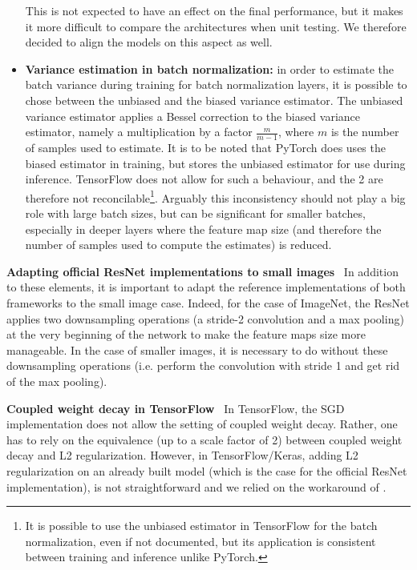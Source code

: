 \documentclass{article}
\newcommand{\myparagraph}[1]{\vspace{1mm}\noindent\textbf{#1} \,}
\begin{document}
\begin{itemize}[topsep=0pt,itemsep=1ex,partopsep=0ex,parsep=0ex,leftmargin=3ex]
    This is not expected to have an effect on the final performance, but it makes it more difficult to compare the architectures when unit testing.
    We therefore decided to align the models on this aspect as well.
    \item \textbf{Variance estimation in batch normalization:} in order to estimate the batch variance during training for batch normalization layers, it is possible to chose between the unbiased and the biased variance estimator.
    The unbiased variance estimator applies a Bessel correction to the biased variance estimator, namely a multiplication by a factor $\frac{m}{m-1}$, where $m$ is the number of samples used to estimate.
    It is to be noted that PyTorch does uses the biased estimator in training, but stores the unbiased estimator for use during inference.
    TensorFlow does not allow for such a behaviour, and the 2 are therefore not reconcilable\footnote{It is possible to use the unbiased estimator in TensorFlow for the batch normalization, even if not documented, but its application is consistent between training and inference unlike PyTorch.}.
    Arguably this inconsistency should not play a big role with large batch sizes, but can be significant for smaller batches, especially in deeper layers where the feature map size (and therefore the number of samples used to compute the estimates) is reduced.
\end{itemize}

\myparagraph{Adapting official ResNet implementations to small images} In addition to these elements, it is important to adapt the reference implementations of both frameworks to the small image case.
Indeed, for the case of ImageNet, the ResNet applies two downsampling operations (a stride-2 convolution and a max pooling) at the very beginning of the network to make the feature maps size more manageable.
In the case of smaller images, it is necessary to do without these downsampling operations (i.e. perform the convolution with stride 1 and get rid of the max pooling).

\myparagraph{Coupled weight decay in TensorFlow}
In TensorFlow, the SGD implementation does not allow the setting of coupled weight decay.
Rather, one has to rely on the equivalence (up to a scale factor of 2) between coupled weight decay and L2 regularization.
However, in TensorFlow/Keras, adding L2 regularization on an already built model (which is the case for the official ResNet implementation), is not straightforward and we relied on the workaround of \citet{silva2019kerasregularization}.
\end{document}
